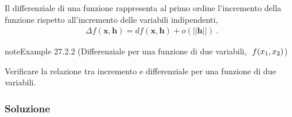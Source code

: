 \documentclass[letterpaper,10pt,italian]{jupyterBook}
\begin{document}
\sphinxAtStartPar
Il differenziale di una funzione rappresenta al primo ordine l’incremento della funzione rispetto all’incremento delle variabili indipendenti,
\begin{equation*}
\begin{split} \Delta f(\mathbf{x}, \mathbf{h}) = df(\mathbf{x}, \mathbf{h}) + o(||\mathbf{h}||)\ .\end{split}
\end{equation*}\label{ch/multivariable-calculus/derivatives:multivariable-calculus:differential}
\begin{sphinxadmonition}{note}{Example 27.2.2 (Differenziale per una funzione di due variabili, \protect\(\ f(x_1, x_2) \protect\))}



\sphinxAtStartPar
Verificare la relazione tra incremento e differenziale per una funzione di due variabili.
\subsubsection*{Soluzione}


\end{sphinxadmonition}
\end{document}
